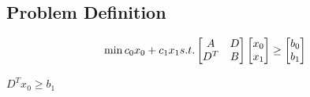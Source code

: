 \documentclass{llncs}
\begin{document}
\subsection{Problem Definition}
\begin{equation}
\min c_0x_0+c_1x_1\\
s.t. \begin{bmatrix}
A & D \\
D^T & B
\end{bmatrix}\begin{bmatrix}
 x_0\\
x_1
\end{bmatrix}\geq \begin{bmatrix}
b_0\\
b_1
\end{bmatrix}
\end{equation}

$D^Tx_0\geq b_1$




\end{document}

